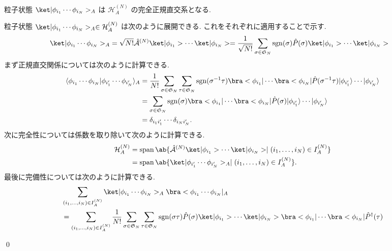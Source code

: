 \documentclass[uplatex,dvipdfmx,a4paper,11pt]{jlreq}
\makeatletter
\DeclareMathOperator{\sgn}{sgn}
\DeclareMathOperator{\Span}{span}
\newcommand{\HH}{\mathcal{H}}
\renewcommand{\SS}{\mathfrak{S}}
\newcommand{\A}{\mathcal{A}}
\numberwithin{equation}{section}
\theoremstyle{definition}
\renewenvironment{proof}[1][\proofname]{\par
  \normalfont
  \topsep6\p@\@plus6\p@ \trivlist
  \item[\hskip\labelsep{\bfseries #1}\@addpunct{\bfseries}]\ignorespaces\quad\par
}{
  \qed\endtrivlist\@endpefalse
}
\renewcommand\proofname{証明}
\makeatother
\begin{document}
\begin{proposition}[Q21-21(iii)(iv)(v)]
  粒子状態 $\ket|\phi_{i_1}\cdots\phi_{i_N}>_A$ は $\HH_A^{(N)}$ の完全正規直交系となる.
\end{proposition}
\begin{proof}
  粒子状態 $\ket|\phi_{i_1}\cdots\phi_{i_N}>_A\in\HH_A^{(N)}$ は次のように展開できる. これをそれぞれに適用することで示す.
  \begin{align}
    \ket|\phi_{i_1}\cdots\phi_{i_N}>_A & = \sqrt{N!}\hat{\A}^{(N)}\ket|\phi_{i_1}>\cdots\ket|\phi_{i_N}> = \frac{1}{\sqrt{N!}}\sum_{\sigma\in\SS_N}\sgn(\sigma)\hat{P}(\sigma)\ket|\phi_{i_1}>\cdots\ket|\phi_{i_N}>
  \end{align}
  まず正規直交関係については次のように計算できる.
  \begin{align}
    \langle\phi_{i_1}\cdots\phi_{i_N}|\phi_{i_1'}\cdots\phi_{i_N'}\rangle_A & = \frac{1}{N!}\sum_{\sigma\in\SS_N}\sum_{\tau\in\SS_N}\sgn(\sigma^{-1}\tau)\bra<\phi_{i_1}|\cdots\bra<\phi_{i_N}|\hat{P}(\sigma^{-1}\tau)|\phi_{i_1'}\rangle\cdots|\phi_{i_N'}\rangle \\
                                                                            & = \sum_{\sigma\in\SS_N}\sgn(\sigma)\bra<\phi_{i_1}|\cdots\bra<\phi_{i_N}|\hat{P}(\sigma)|\phi_{i_1'}\rangle\cdots|\phi_{i_N'}\rangle                                                  \\
                                                                            & = \delta_{i_1i_1'}\cdots\delta_{i_Ni_N'}.
  \end{align}
  次に完全性については係数を取り除いて次のように計算できる.
  \begin{align}
    \HH_A^{(N)} & = \Span\ab\{\hat{\A}^{(N)}\ket|\phi_{i_1}>\cdots\ket|\phi_{i_N}> \mid (i_1,\ldots,i_N)\in I_A^{(N)} \} \\
                & = \Span\ab\{\ket|\phi_{i_1'}\cdots\phi_{i_N'}>_A \mid (i_1,\ldots,i_N)\in I_A^{(N)} \}.
  \end{align}
  最後に完備性については次のように計算できる.
  \begin{align}
     & \sum_{(i_1,\ldots,i_N)\in I_A^{(N)}}\ket|\phi_{i_1}\cdots\phi_{i_N}>_A\bra<\phi_{i_1}\cdots\phi_{i_N}|_A                                                                                                                   \\
     & = \sum_{(i_1,\ldots,i_N)\in I_A^{(N)}}\frac{1}{N!}\sum_{\sigma\in\SS_N}\sum_{\tau\in\SS_N}\sgn(\sigma\tau)\hat{P}(\sigma)\ket|\phi_{i_1}>\cdots\ket|\phi_{i_N}>\bra<\phi_{i_1}|\cdots\bra<\phi_{i_N}|\hat{P}^\dagger(\tau) \\

\end{align}
\end{proof}
\end{document}
